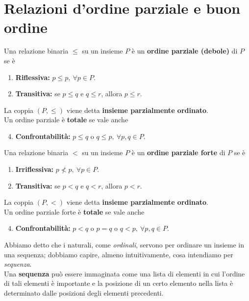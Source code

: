 \section{Relazioni d'ordine parziale e buon ordine}
\begin{define}
	Una relazione binaria $\leq$ su un insieme $P$ è un \textbf{ordine parziale (debole)} di $P$ se è
	\begin{enumerate}
		\item \textbf{Riflessiva:} $p\leq p,\ \forall p\in P$.
		\item \textbf{Transitiva:} se $p\leq q$ e $q\leq r$, allora $p\leq r$.
	\end{enumerate}
	La coppia $\left(P,\leq\right)$ viene detta \textbf{insieme parzialmente ordinato}.\\
	Un ordine parziale è \textbf{totale} se vale anche
	\begin{enumerate}
		\setcounter{enumi}{3}
		\item \textbf{Confrontabilità:} $p\leq q$ o $q\leq p,\ \forall p,q\in P$.
	\end{enumerate}
\end{define}
\begin{define}
	Una relazione binaria $<$ su un insieme $P$ è un \textbf{ordine parziale forte} di $P$ se è
	\begin{enumerate}
		\item \textbf{Irriflessiva:} $p\nless p,\ \forall p\in P$.
		\item \textbf{Transitiva:} se $p<q$ e $q<r$, allora $p<r$.
	\end{enumerate}
	La coppia $\left(P,<\right)$ viene detta \textbf{insieme parzialmente ordinato}.\\
	Un ordine parziale forte è \textbf{totale} se vale anche
	\begin{enumerate}
		\setcounter{enumi}{3}
		\item \textbf{Confrontabilità:} $p<q$ o $p=q$ o $q<p,\ \forall p,q\in P$.
	\end{enumerate}
\end{define}
Abbiamo detto che i naturali, come \textit{ordinali}, servono per ordinare un insieme in una sequenza; dobbiamo capire, almeno intuitivamente, cosa intendiamo per \textit{sequenza}.\\
Una \textbf{sequenza} può essere immaginata come una lista di elementi in cui l'ordine di tali elementi è importante e la posizione di un certo elemento nella lista è determinato dalle posizioni degli elementi precedenti.\\

